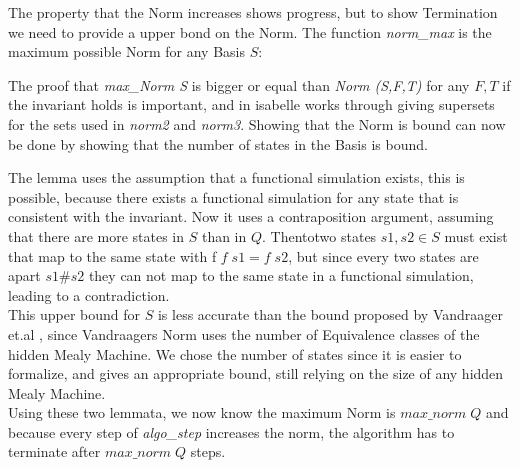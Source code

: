 The property that the Norm increases shows progress, but to show Termination we need to provide a upper bond on the Norm. The function \textit{norm\_max} is the maximum possible Norm for any Basis $S$: 
\begin{myisabelle}
	\maxnorm
\end{myisabelle}
The proof that \textit{max\_Norm S} is bigger or equal than \textit{Norm (S,F,T)} for any $F,T$ if the invariant holds is important, and in isabelle works through giving supersets for the sets used in \textit{norm2} and \textit{norm3}. Showing that the Norm is bound can now be done by showing that the number of states in the Basis is bound. 
\begin{myisabelle}
\maxs
\end{myisabelle}
The lemma uses the assumption that a functional simulation exists, this is possible, because there exists a functional simulation for any state that is consistent with the invariant. Now it uses a contraposition argument, assuming that there are more states in $S$ than in $Q$. Thentotwo states $s1,s2\in S$ must exist that map to the same state with f $f\; s1=f\; s2$, but since every two states are apart $s1\#s2$ they can not map to the same state in a functional simulation, leading to a contradiction.\\
This upper bound for $S$ is less accurate than the bound proposed by Vandraager et.al \cite{vandraagerlsharp}, since Vandraagers Norm uses the number of Equivalence classes of the hidden Mealy Machine. We chose the number of states since it is easier to formalize, and gives an appropriate bound, still relying on the size of any hidden Mealy Machine. \\
Using these two lemmata, we now know the maximum Norm is $max\_norm\; Q$ and because every step of \textit{algo\_step} increases the norm, the algorithm has to terminate after $max\_norm\; Q$ steps. 

